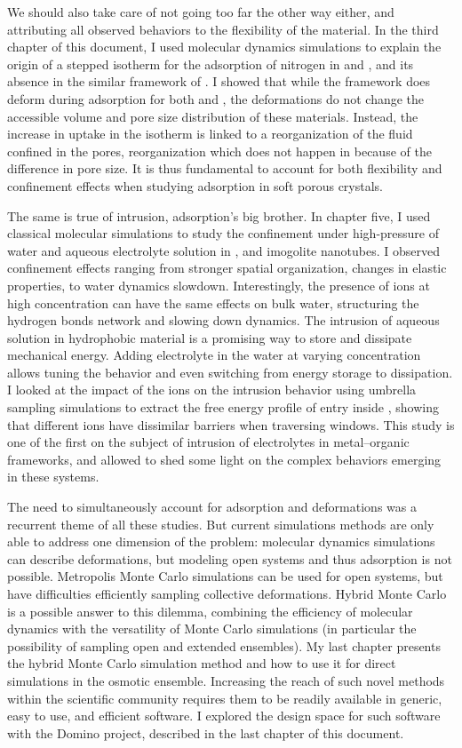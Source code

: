 We should also take care of not going too far the other way either, and
attributing all observed behaviors to the flexibility of the material. In the third
chapter of this document, I used \abinitio molecular dynamics simulations to
explain the origin of a stepped isotherm for the adsorption of nitrogen in
 and \ZIFCl, and its absence in the similar framework of \ZIFBr. I showed
that while the framework does deform during adsorption for both  and
\ZIFCl, the deformations do not change the accessible volume and pore size
distribution of these materials. Instead, the increase in uptake in the isotherm
is linked to a reorganization of the fluid confined in the pores, reorganization
which does not happen in \ZIFBr because of the difference in pore size. It is
thus fundamental to account for both flexibility and confinement effects when
studying adsorption in soft porous crystals.

The same is true of intrusion, adsorption's big brother. In chapter five, I used
classical molecular simulations to study the confinement under high-pressure of
water and aqueous electrolyte solution in , and imogolite nanotubes. I
observed confinement effects ranging from stronger spatial organization, changes
in elastic properties, to water dynamics slowdown. Interestingly, the presence
of ions at high concentration can have the same effects on bulk water,
structuring the hydrogen bonds network and slowing down dynamics. The intrusion
of aqueous solution in hydrophobic material is a promising way to store and
dissipate mechanical energy. Adding electrolyte in the water at varying
concentration allows tuning the behavior and even switching from energy storage
to dissipation. I looked at the impact of the ions on the intrusion behavior
using umbrella sampling simulations to extract the free energy profile of entry
inside , showing that different ions have dissimilar barriers when
traversing  windows. This study is one of the first on the subject of
intrusion of electrolytes in metal--organic frameworks, and allowed to shed some
light on the complex behaviors emerging in these systems.

The need to simultaneously account for adsorption and deformations was a
recurrent theme of all these studies. But current simulations methods are only
able to address one dimension of the problem: molecular dynamics simulations can
describe deformations, but modeling open systems and thus adsorption is not
possible. Metropolis Monte Carlo simulations can be used for open systems, but
have difficulties efficiently sampling collective deformations. Hybrid Monte
Carlo is a possible answer to this dilemma, combining the efficiency of
molecular dynamics with the versatility of Monte Carlo simulations (in
particular the possibility of sampling open and extended ensembles). My last
chapter presents the hybrid Monte Carlo simulation method and how to use it for
direct simulations in the osmotic ensemble. Increasing the reach of such novel
methods within the scientific community requires them to be readily available in
generic, easy to use, and efficient software. I explored the design space for
such software with the Domino project, described in the last chapter of this
document.

